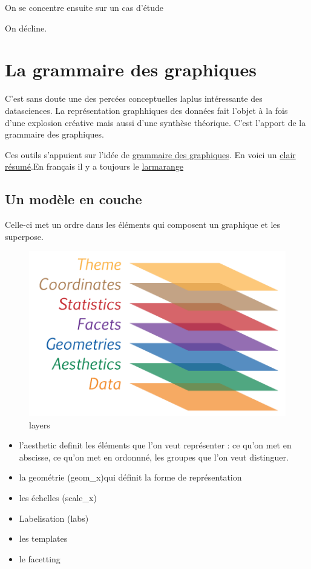 \documentclass[
]{book}
\providecommand{\tightlist}{%
  \setlength{\itemsep}{0pt}\setlength{\parskip}{0pt}}
\begin{document}
On se concentre ensuite sur un cas d'étude

On décline.

\hypertarget{la-grammaire-des-graphiques}{%
\section{La grammaire des graphiques}\label{la-grammaire-des-graphiques}}

C'est sans doute une des percées conceptuelles laplus intéressante des datasciences. La représentation graphhiques des données fait l'objet à la fois d'une explosion créative mais aussi d'une synthèse théorique. C'est l'apport de la grammaire des graphiques.

Ces outils s'appuient sur l'idée de \href{https://www.goodreads.com/book/show/2549408.The_Grammar_of_Graphics}{grammaire des graphiques}. En voici un \href{https://cfss.uchicago.edu/notes/grammar-of-graphics/}{clair résumé}.En français il y a toujours le \href{http://larmarange.github.io/analyse-R/intro-ggplot2.html}{larmarange}

\hypertarget{un-moduxe8le-en-couche}{%
\subsection{Un modèle en couche}\label{un-moduxe8le-en-couche}}

Celle-ci met un ordre dans les éléments qui composent un graphique et les superpose.

\begin{figure}
\centering
\includegraphics{./Images/graphiclayers.png}
\caption{layers}
\end{figure}

\begin{itemize}
\tightlist
\item
  l'aesthetic definit les éléments que l'on veut représenter : ce qu'on met en abscisse, ce qu'on met en ordonnné, les groupes que l'on veut distinguer.
\item
  la geométrie (geom\_x)qui définit la forme de représentation
\item
  les échelles (scale\_x)
\item
  Labelisation (labs)
\item
  les templates
\item
  le facetting
\end{itemize}
\end{document}
